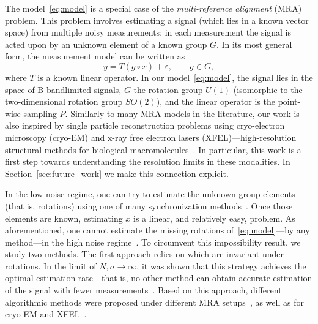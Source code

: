 \documentclass[english,12pt]{article}
\numberwithin{equation}{section}
\numberwithin{thm}{section} %
\begin{document}
The model~\eqref{eq:model} is a special case of the \emph{multi-reference alignment} (MRA) problem. This problem involves estimating a signal (which lies in a known vector space) from multiple noisy measurements; in each measurement the signal is acted upon by an unknown element of a known group $G$. 
In its most general form, the measurement model can be written as 
\begin{equation} \label{eq:mra}
y = T(g\circ x) +\varepsilon, \qquad g\in G,
\end{equation}
where $T$ is a known linear operator. 
In our model~\eqref{eq:model}, the signal lies in the space of B-bandlimited signals, $G$ the rotation group $U(1)$ (isomorphic to the  two-dimensional rotation group $SO(2)$), and the linear operator is the point-wise sampling $P$.
Similarly to many MRA models in the literature,  our work is also inspired by single particle reconstruction problems using cryo-electron microscopy (cryo-EM) and x-ray free electron lasers (XFEL)---high-resolution structural methods for biological macromolecules~\cite{frank2006three,kuhlbrandt2014resolution,singer2018mathematics}. 
In particular, this work is a first step towards understanding the resolution limits in these modalities. In Section~\ref{sec:future_work} we make this connection explicit.

In the low noise regime, one can try to estimate the unknown group elements (that is, rotations) using one of many synchronization methods~\cite{singer2011angular,bandeira2015non,boumal2016nonconvex,chen2018projected,singer2011three}.
Once those elements are known, estimating $x$ is a linear, and relatively easy, problem. 
As aforementioned, one cannot estimate the missing rotations of~\eqref{eq:model}---by any method---in the high noise regime~\cite{bendory2018toward,aguerrebere2016fundamental}.
To circumvent this impossibility result, we study two methods.
The first approach relies on which are invariant 
under rotations. In the limit of $N,\sigma\to\infty$, it was shown that this strategy achieves the optimal  estimation rate---that is, no other method can obtain accurate estimation of the signal with fewer measurements~\cite{bandeira2017optimal,bandeira2017estimation,abbe2018multireference,abbe2018estimation}. Based on this approach, different algorithmic methods were proposed under different MRA setups~\cite{bendory2017bispectrum,perry2017sample,abbe2018multireference,boumal2018heterogeneous,chen2018spectral,ma2018heterogeneous,bandeira2014multireference}, as well as for  cryo-EM and XFEL~\cite{kam1980reconstruction,liu2013three,kurta2017correlations,levin20173d,bendory2018toward,pande2018ab,von2018structure}. 
\end{document}
